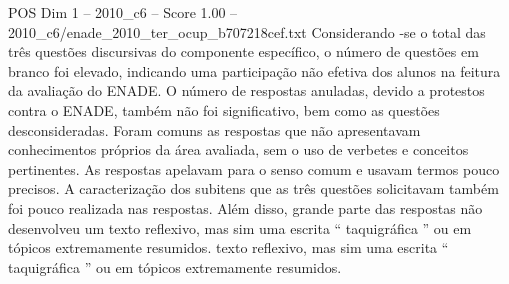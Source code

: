 \begin{textsample}{POS Dim 1 – 2010\_c6 – Score 1.00 – 2010\_c6/enade\_2010\_ter\_ocup\_b707218cef.txt}
Considerando -se o total das três questões discursivas do componente específico, o número de questões em branco foi elevado, indicando uma participação não efetiva dos alunos na feitura da avaliação do ENADE.
O número de respostas anuladas, devido a protestos contra o ENADE, também não foi significativo, bem como as questões desconsideradas.
Foram comuns as respostas que não apresentavam conhecimentos próprios da área avaliada, sem o uso de verbetes e conceitos pertinentes.
As respostas apelavam para o senso comum e usavam termos pouco precisos.
A caracterização dos subitens que as três questões solicitavam também foi pouco realizada nas respostas.
Além disso, grande parte das respostas não desenvolveu um texto reflexivo, mas sim uma escrita “ taquigráfica ” ou em tópicos extremamente resumidos. texto reflexivo, mas sim uma escrita “ taquigráfica ” ou em tópicos extremamente resumidos.

\end{textsample}

